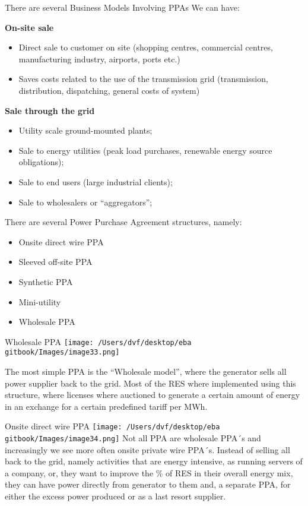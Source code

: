\documentclass[]{book}
\theoremstyle{definition}
\theoremstyle{definition}
\theoremstyle{definition}
\theoremstyle{remark}
\begin{document}
There are several Business Models Involving PPAs We can have:

\textbf{On-site sale}

\begin{itemize}
\item
  Direct sale to customer on site (shopping centres, commercial centres,
  manufacturing industry, airports, ports etc.)
\item
  Saves costs related to the use of the transmission grid (transmission,
  distribution, dispatching, general costs of system)
\end{itemize}

\textbf{Sale through the grid}

\begin{itemize}
\item
  Utility scale ground-mounted plants;
\item
  Sale to energy utilities (peak load purchases, renewable energy source
  obligations);
\item
  Sale to end users (large industrial clients);
\item
  Sale to wholesalers or ``aggregators'';
\end{itemize}

There are several Power Purchase Agreement structures, namely:

\begin{itemize}
\item
  Onsite direct wire PPA
\item
  Sleeved off-site PPA
\item
  Synthetic PPA
\item
  Mini-utility
\item
  Wholesale PPA
\end{itemize}

Wholesale PPA
\texttt{[image: /Users/dvf/desktop/eba gitbook/Images/image33.png]}

The most simple PPA is the ``Wholesale model'', where the generator
sells all power supplier back to the grid. Most of the RES where
implemented using this structure, where licenses where auctioned to
generate a certain amount of energy in an exchange for a certain
predefined tariff per MWh.

Onsite direct wire PPA
\texttt{[image: /Users/dvf/desktop/eba gitbook/Images/image34.png]}
Not all PPA are wholesale PPA´s and increasingly we see more often
onsite private wire PPA´s. Instead of selling all back to the grid,
namely activities that are energy intensive, as running servers of a
company, or, they want to improve the \% of RES in their overall energy
mix, they can have power directly from generator to them and, a separate
PPA, for either the excess power produced or as a last resort supplier.
\end{document}

